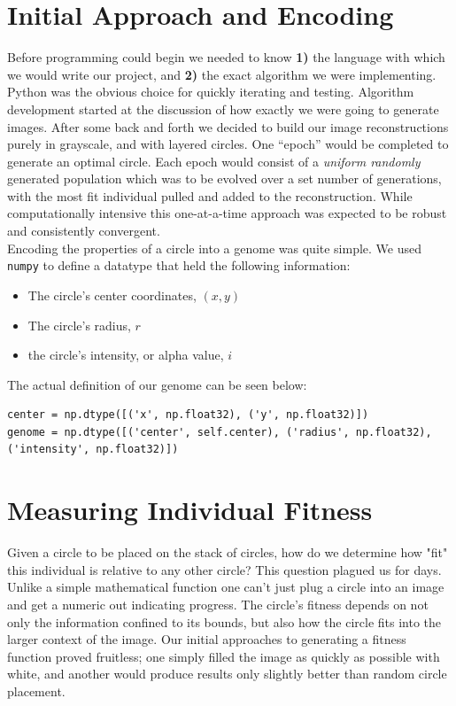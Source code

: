 \documentclass[12pt]{article}
\begin{document}
\section*{Initial Approach and Encoding}
Before programming could begin we needed to know \textbf{1)} the language with which we would write our project, and \textbf{2)} the exact algorithm we were implementing. Python was the obvious choice for quickly iterating and testing. Algorithm development started at the discussion of how exactly we were going to generate images. After some back and forth we decided to build our image reconstructions purely in grayscale, and with layered circles. One ``epoch'' would be completed to generate an optimal circle. Each epoch would consist of a \textit{uniform randomly} generated population which was to be evolved over a set number of generations, with the most fit individual pulled and added to the reconstruction. While computationally intensive this one-at-a-time approach was expected to be robust and consistently convergent. 
\\
Encoding the properties of a circle into a genome was quite simple. We used \verb|numpy| to define a datatype that held the following information:
\begin{itemize}
\item The circle's center coordinates, $(x, y)$
\item The circle's radius, $r$
\item the circle's intensity, or alpha value, $i$
\end{itemize}

The actual definition of our genome can be seen below:
\begin{verbatim}
center = np.dtype([('x', np.float32), ('y', np.float32)])
genome = np.dtype([('center', self.center), ('radius', np.float32), ('intensity', np.float32)])
\end{verbatim}


\section*{Measuring Individual Fitness}
Given a circle to be placed on the stack of circles, how do we determine how "fit" this individual is relative to any other circle? This question plagued us for days. Unlike a simple mathematical function one can't just plug a circle into an image and get a numeric out indicating progress. The circle's fitness depends on not only the information confined to its bounds, but also how the circle fits into the larger context of the image. Our initial approaches to generating a fitness function proved fruitless; one simply filled the image as quickly as possible with white, and another would produce results only slightly better than random circle placement. 
\end{document}
